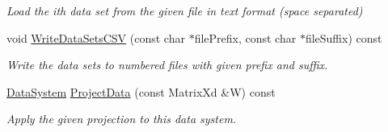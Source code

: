 \begin{DoxyCompactItemize}
\begin{DoxyCompactList}\small\item\em Load the ith data set from the given file in text format (space separated) \end{DoxyCompactList}\item 
\hypertarget{struct_d_r_d_s_p_1_1_data_system_a6b4e0e6bc3ba1135a08fc2c2ed874e39}{void \hyperlink{struct_d_r_d_s_p_1_1_data_system_a6b4e0e6bc3ba1135a08fc2c2ed874e39}{Write\-Data\-Sets\-C\-S\-V} (const char $\ast$file\-Prefix, const char $\ast$file\-Suffix) const }\label{struct_d_r_d_s_p_1_1_data_system_a6b4e0e6bc3ba1135a08fc2c2ed874e39}

\begin{DoxyCompactList}\small\item\em Write the data sets to numbered files with given prefix and suffix. \end{DoxyCompactList}\item 
\hypertarget{struct_d_r_d_s_p_1_1_data_system_afd5e714d21c0d7c1b1efb65b233788ab}{\hyperlink{struct_d_r_d_s_p_1_1_data_system}{Data\-System} \hyperlink{struct_d_r_d_s_p_1_1_data_system_afd5e714d21c0d7c1b1efb65b233788ab}{Project\-Data} (const Matrix\-Xd \&W) const }\label{struct_d_r_d_s_p_1_1_data_system_afd5e714d21c0d7c1b1efb65b233788ab}

\begin{DoxyCompactList}\small\item\em Apply the given projection to this data system. \end{DoxyCompactList}\end{DoxyCompactItemize}
